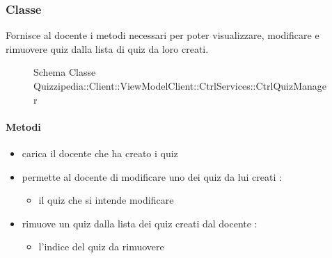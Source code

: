 \subsubsection{Classe }
Fornisce al docente i metodi necessari per poter visualizzare, modificare e rimuovere quiz dalla lista di quiz da loro creati.
\begin{figure}[H]
\centering
\noindent{}
\caption[Schema Classe CtrlQuizManager]{Schema Classe Quizzipedia::Client::ViewModelClient::CtrlServices::CtrlQuizManager}
\end{figure}
\paragraph{Metodi}
\begin{itemize}
\item {}
\newline
carica il docente che ha creato i quiz
\newline
\item {}
\newline
permette al docente di modificare uno dei quiz da lui creati
\newline
{} :
\begin{itemize}
\item {}
\newline
il quiz che si intende modificare
\end{itemize}
\item {}
\newline
rimuove un quiz dalla lista dei quiz creati dal docente
\newline
{} :
\begin{itemize}
\item {}
\newline
l'indice del quiz da rimuovere
\end{itemize}
\end{itemize}
